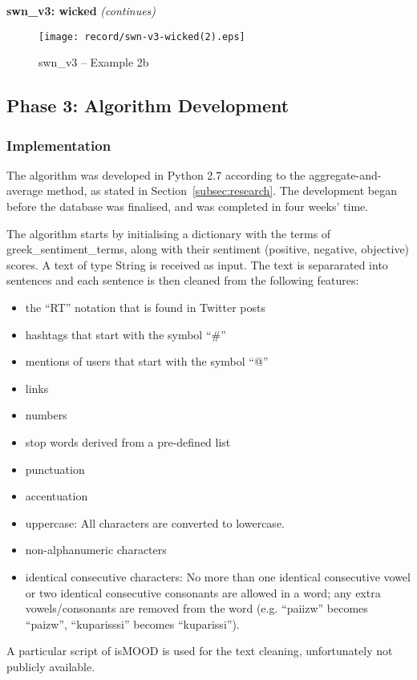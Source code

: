\clearpage

\textbf{swn\_v3: wicked} \textit{(continues)} \\

\begin{figure}[ht]
\centering
\texttt{[image: record/swn-v3-wicked(2).eps]}
\caption{swn\_v3 -- Example 2b}
\label{fig:swn-wicked2}
\end{figure}

\clearpage

\subsection{Phase 3: Algorithm Development}
\label{subsec:algorithm}

\subsubsection{Implementation}
\label{subsubsec:algimplementation}

The algorithm was developed in Python 2.7
according to the aggregate-and-average method,
as stated in Section~\ref{subsec:research}.
The development began before the database was finalised,
and was completed in four weeks' time.

The algorithm starts by initialising a dictionary
with the terms of greek\_sentiment\_terms,
along with their sentiment (positive, negative, objective) scores.
A text of type String is received as input.
The text is separarated into sentences
and each sentence is then cleaned from the following features:

\begin{itemize}
 \item the ``RT'' notation that is found in Twitter posts
 \item hashtags that start with the symbol ``\#''
 \item mentions of users that start with the symbol ``@''
 \item links
 \item numbers
 \item stop words derived from a pre-defined list
 \item punctuation
 \item accentuation
 \item uppercase: All characters are converted to lowercase.
 \item non-alphanumeric characters
 \item identical consecutive characters:
 No more than one identical consecutive vowel
 or two identical consecutive consonants are allowed in a word;
 any extra vowels/consonants are removed from the word
 (e.g. ``\textgreek{paiizw}'' becomes ``\textgreek{paizw}'',
 ``\textgreek{kuparisssi}'' becomes ``\textgreek{kuparissi}'').
\end{itemize}
A particular script of isMOOD is used for the text cleaning,
unfortunately not publicly available.

